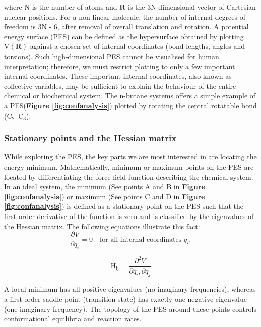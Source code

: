 \documentclass[12pt]{article}
\begin{document}
where N is the number of atoms and $\mathbf{\textrm{R}}$ is the 3N-dimensional vector of Cartesian nuclear positions. For a non-linear molecule, the number of internal degrees of freedom is 3N - 6, after removal of overall translation and rotation. A potential energy surface (PES) can be defined as the hypersurface obtained by plotting $\textrm{V}(\mathbf{\textrm{R}})$ against a chosen set of internal coordinates (bond lengths, angles and torsions). Such high-dimensional PES cannot be visualised for human interpretation; therefore, we must restrict plotting to only a few important internal coordinates. These important internal coordinates, also known as collective variables, may be sufficient to explain the behaviour of the entire chemical or biochemical system. The n-butane systems offers a simple example of a PES(\textbf{Figure \ref{fig:confanalysis}}) plotted by rotating the central rotatable bond ($\textrm{C}_\textrm{2}$--$\textrm{C}_\textrm{3}$).

\subsubsection{Stationary points and the Hessian matrix}
While exploring the PES, the key parts we are most interested in are locating the energy minimum. Mathematically, minimum or maximum points on the PES are located by differentiating the force field function describing the chemical system. In an ideal system, the minimum (See points A and B in \textbf{Figure \ref{fig:confanalysis}}) or maximum (See points C and D in \textbf{Figure \ref{fig:confanalysis}}) is defined as a stationary point on the PES such that the first-order derivative of the function is zero and is classified by the eigenvalues of the Hessian matrix. The following equations illustrate this fact:
\begin{equation}
    \frac{\partial V}{\partial q_i} = 0
    \quad\textrm{for all internal coordinates }  q_i,
    \label{eq:PES_der}
\end{equation}

\begin{equation}
    \textrm{H}_{\textrm{ij}} = \frac{\partial^2 V}{\partial q_i,\partial q_j}
    \label{eq:PES_hamil}
\end{equation}

A local minimum has all positive eigenvalues (no imaginary frequencies), whereas a first-order saddle point (transition state) has exactly one negative eigenvalue (one imaginary frequency). The topology of the PES around these points controls conformational equilibria and reaction rates\cite{CH2_Jensen2017}.
\end{document}
